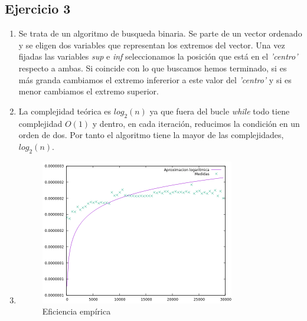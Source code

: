 \subsection*{Ejercicio 3}


\begin{enumerate}
\item {} Se trata de un
  algoritmo de busqueda binaria. Se parte de un vector ordenado y se
  eligen dos variables que representan los extremos del vector. Una
  vez fijadas las variables \textit{sup} e \textit{inf} seleccionamos
  la posición que está en el \textit{'centro'} respecto a ambas. Si
  coincide con lo que buscamos hemos terminado, si es más granda
  cambiamos el extremo infererior a este valor del \textit{'centro'} y
  si es menor cambiamos el extremo superior.

\item {} La complejidad teórica es $log_2(n)$ ya que fuera del bucle
  \textit{while} todo tiene complejidad $O(1)$ y dentro, en cada
  iteración, reducimos la condición en un orden de dos. Por tanto el
  algoritmo tiene la mayor de las complejidades, $log_2(n)$.

\item {}

\begin{figure}[H]
  \centering
  \caption{Eficiencia empírica}
  \includegraphics[width=0.8\textwidth]{ejer3/comparacion.png}
\end{figure}


\end{enumerate}
